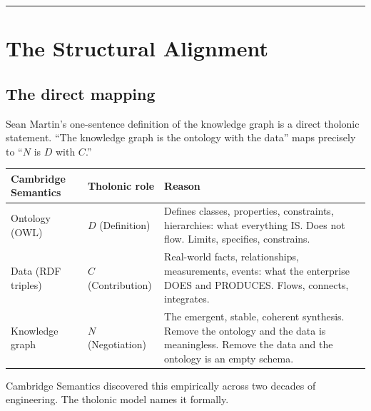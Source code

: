 \documentclass[12pt]{article}
\begin{document}
\begin{center}\rule{0.5\linewidth}{0.5pt}\end{center}

\section{The Structural Alignment}\label{the-structural-alignment}

\subsection{The direct mapping}\label{the-direct-mapping}

Sean Martin's one-sentence definition of the knowledge graph is a direct
tholonic statement. ``The knowledge graph is the ontology with the
data'' maps precisely to ``\(N\) is \(D\) with \(C\).''

\begin{longtable}[]{@{}
  >{\raggedright\arraybackslash}p{}
  >{\raggedright\arraybackslash}p{}
  >{\raggedright\arraybackslash}p{}@{}}
\toprule\noalign{}
\begin{minipage}[b]{\linewidth}\raggedright
Cambridge Semantics
\end{minipage} & \begin{minipage}[b]{\linewidth}\raggedright
Tholonic role
\end{minipage} & \begin{minipage}[b]{\linewidth}\raggedright
Reason
\end{minipage} \\
\midrule\noalign{}
\endhead
\bottomrule\noalign{}
\endlastfoot
Ontology (OWL) & \(D\) (Definition) & Defines classes, properties,
constraints, hierarchies: what everything IS. Does not flow. Limits,
specifies, constrains. \\
Data (RDF triples) & \(C\) (Contribution) & Real-world facts,
relationships, measurements, events: what the enterprise DOES and
PRODUCES. Flows, connects, integrates. \\
Knowledge graph & \(N\) (Negotiation) & The emergent, stable, coherent
synthesis. Remove the ontology and the data is meaningless. Remove the
data and the ontology is an empty schema. \\
\end{longtable}

Cambridge Semantics discovered this empirically across two decades of
engineering. The tholonic model names it formally.
\end{document}

